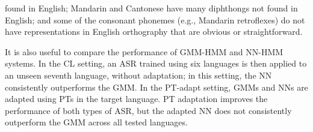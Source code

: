 found in English; Mandarin and 
Cantonese have many diphthongs not found in English; and some of the 
consonant phonemes (e.g., Mandarin retroflexes) do not have 
representations in English orthography that are obvious or 
straightforward. %

It is also useful to compare the performance of GMM-HMM and NN-HMM
systems.  In the {\sc CL} setting, an ASR trained
using six languages is then applied to an unseen seventh language,
without adaptation; in this setting, the NN consistently outperforms
the GMM.  In the {\sc PT-adapt} setting, GMMs and NNs are
adapted using PTs in the target language.  PT adaptation improves the
performance of both types of ASR, but the
adapted NN does not consistently outperform the GMM across all
tested languages.

